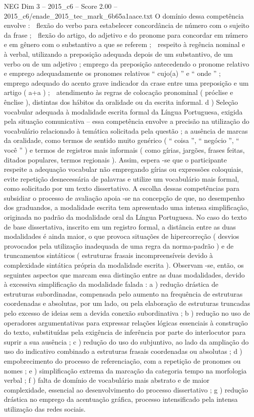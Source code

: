 \begin{textsample}{NEG Dim 3 – 2015\_c6 – Score 2.00 – 2015\_c6/enade\_2015\_tec\_mark\_6b65a1aace.txt}
O domínio dessa competência envolve :  flexão do verbo para estabelecer concordância de número com o sujeito da frase ;  flexão do artigo, do adjetivo e do pronome para concordar em número e em gênero com o substantivo a que se referem ;  respeito à regência nominal e à verbal, utilizando a preposição adequada depois de um substantivo, de um verbo ou de um adjetivo ; emprego da preposição antecedendo o pronome relativo e emprego adequadamente os pronomes relativos “ cujo(a) ” e “ onde ” ;  emprego adequado do acento grave indicador da crase entre uma preposição e um artigo ( a+a ) ;  atendimento às regras de colocação pronominal ( próclise e ênclise ), distintas dos hábitos da oralidade ou da escrita informal. d ) Seleção vocabular adequada à modalidade escrita formal da Língua Portuguesa, exigida pela situação comunicativa – essa competência envolve a precisão na utilização do vocabulário relacionado à temática solicitada pela questão ; a ausência de marcas da oralidade, como termos de sentido muito genérico ( “ coisa ”, “ negócio ”, “ você ” ) e termos de registros mais informais ( como gírias, jargões, frases feitas, ditados populares, termos regionais ).
Assim, espera -se que o participante respeite a adequação vocabular não empregando gírias ou expressões coloquiais, evite repetição desnecessária de palavras e utilize um vocabulário mais formal, como solicitado por um texto dissertativo.
A escolha dessas competências para subsidiar o processo de avaliação apoia -se na concepção de que, no desempenho dos graduandos, a modalidade escrita tem apresentado uma intensa simplificação, originada no padrão da modalidade oral da Língua Portuguesa.
No caso do texto de base dissertativa, inscrito em um registro formal, a distância entre as duas modalidades é ainda maior, o que provoca situações de hipercorreção ( desvios provocados pela utilização inadequada de uma regra da norma-padrão ) e de truncamentos sintáticos ( estruturas frasais incompreensíveis devido à complexidade sintática própria da modalidade escrita ).
Observam -se, então, os seguintes aspectos que marcam essa distinção entre as duas modalidades, devido à excessiva simplificação da modalidade falada : a ) redução drástica de estruturas subordinadas, compensada pelo aumento na frequência de estruturas coordenadas e absolutas, por um lado, ou pela elaboração de estruturas truncadas pelo excesso de ideias sem a devida conexão subordinativa ; b ) redução no uso de operadores argumentativas para expressar relações lógicas essenciais à construção do texto, substituídas pela exigência de inferência por parte do interlocutor para suprir a sua ausência ; c ) redução do uso do subjuntivo, ao lado da ampliação do uso do indicativo combinado a estruturas frasais coordenadas ou absolutas ; d ) empobrecimento do processo de referenciação, com a repetição de pronomes ou nomes ; e ) simplificação extrema da marcação da categoria tempo na morfologia verbal ; f ) falta de domínio de vocabulário mais abstrato e de maior complexidade, essencial ao desenvolvimento do processo dissertativo ; g ) redução drástica no emprego da acentuação gráfica, processo intensificado pela intensa utilização das redes sociais.

\end{textsample}
